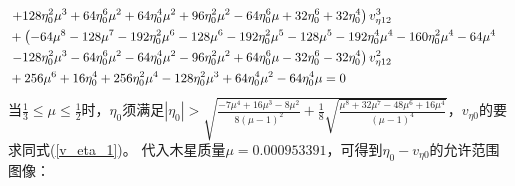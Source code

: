 \begin{align}
    \notag\\
    &\left.+128 \eta_0^2 \mu ^3+64 \eta_0^6 \mu ^2+64 \eta_0^4 \mu ^2+96 \eta_0^2 \mu ^2-64 \eta_0^6 \mu +32 \eta_0^6+32 \eta_0^4\right) v_{\eta12}^3
    \notag\\
    &+\left(-64 \mu ^8-128 \mu ^7-192 \eta_0^2 \mu ^6-128 \mu ^6-192 \eta_0^2 \mu ^5-128 \mu ^5-192 \eta_0^4 \mu ^4-160 \eta_0^2 \mu ^4-64 \mu ^4\right.
    \notag\\
    &\left.-128 \eta_0^2 \mu ^3-64 \eta_0^6 \mu ^2-64 \eta_0^4 \mu ^2-96 \eta_0^2 \mu ^2+64 \eta_0^6 \mu -32 \eta_0^6-32 \eta_0^4\right) v_{\eta12}^2
    \notag\\
    &+256 \mu ^6+16 \eta_0^4+256 \eta_0^2 \mu ^4-128 \eta_0^2 \mu ^3+64 \eta_0^4 \mu ^2-64 \eta_0^4 \mu=0
\end{align}
当$\frac{1}{3}\leq\mu\leq\frac{1}{2}$时，$\eta_0$须满足$|\eta_0|>\sqrt{\frac{-7 \mu ^4+16 \mu ^3-8 \mu ^2}{8 (\mu -1)^2}+\frac{1}{8} \sqrt{\frac{\mu ^8+32 \mu ^7-48 \mu ^6+16 \mu ^4}{(\mu -1)^4}}}$，$v_{\eta0}$的要求同式(\ref{v_eta_1})。
代入木星质量$\mu=0.000953391$，可得到$\eta_0-v_{\eta0}$的允许范围图像：

